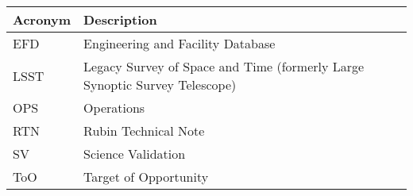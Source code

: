 \addtocounter{table}{-1}
\begin{longtable}{p{}p{}}\hline
\textbf{Acronym} & \textbf{Description}  \\\hline

EFD & Engineering and Facility Database \\\hline
LSST & Legacy Survey of Space and Time (formerly Large Synoptic Survey Telescope) \\\hline
OPS & Operations \\\hline
RTN & Rubin Technical Note \\\hline
SV & Science Validation \\\hline
ToO & Target of Opportunity \\\hline
\end{longtable}
